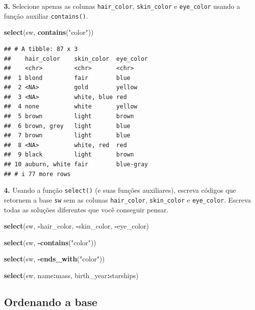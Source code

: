 \documentclass[
]{book}
\newenvironment{Shaded}{\begin{snugshade}}{\end{snugshade}}
\newcommand{\FunctionTok}[1]{\textcolor[rgb]{0.13,0.29,0.53}{\textbf{#1}}}
\newcommand{\NormalTok}[1]{#1}
\newcommand{\SpecialCharTok}[1]{\textcolor[rgb]{0.81,0.36,0.00}{\textbf{#1}}}
\newcommand{\StringTok}[1]{\textcolor[rgb]{0.31,0.60,0.02}{#1}}
\begin{document}
\textbf{3.} Selecione apenas as colunas \texttt{hair\_color}, \texttt{skin\_color} e
\texttt{eye\_color} usando a função auxiliar \texttt{contains()}.

\begin{Shaded}
\begin{Highlighting}[]
\FunctionTok{select}\NormalTok{(sw, }\FunctionTok{contains}\NormalTok{(}\StringTok{"color"}\NormalTok{))}
\end{Highlighting}
\end{Shaded}

\begin{verbatim}
## # A tibble: 87 x 3
##    hair_color    skin_color  eye_color
##    <chr>         <chr>       <chr>    
##  1 blond         fair        blue     
##  2 <NA>          gold        yellow   
##  3 <NA>          white, blue red      
##  4 none          white       yellow   
##  5 brown         light       brown    
##  6 brown, grey   light       blue     
##  7 brown         light       blue     
##  8 <NA>          white, red  red      
##  9 black         light       brown    
## 10 auburn, white fair        blue-gray
## # i 77 more rows
\end{verbatim}

\textbf{4.} Usando a função \texttt{select()} (e suas funções auxiliares), escreva
códigos que retornem a base \texttt{sw} sem as colunas \texttt{hair\_color},
\texttt{skin\_color} e \texttt{eye\_color}. Escreva todas as soluções diferentes que
você conseguir pensar.

\begin{Shaded}
\begin{Highlighting}[]
\FunctionTok{select}\NormalTok{(sw, }\SpecialCharTok{{-}}\NormalTok{hair\_color, }\SpecialCharTok{{-}}\NormalTok{skin\_color, }\SpecialCharTok{{-}}\NormalTok{eye\_color)}

\FunctionTok{select}\NormalTok{(sw, }\SpecialCharTok{{-}}\FunctionTok{contains}\NormalTok{(}\StringTok{"color"}\NormalTok{))}

\FunctionTok{select}\NormalTok{(sw, }\SpecialCharTok{{-}}\FunctionTok{ends\_with}\NormalTok{(}\StringTok{"color"}\NormalTok{))}

\FunctionTok{select}\NormalTok{(sw, name}\SpecialCharTok{:}\NormalTok{mass, birth\_year}\SpecialCharTok{:}\NormalTok{starships)}
\end{Highlighting}
\end{Shaded}

\subsection{Ordenando a base}\label{ordenando-a-base}
\end{document}
